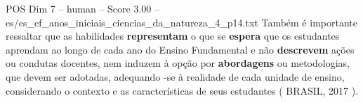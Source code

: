 \begin{textsample}{POS Dim 7 – human – Score 3.00 – es/es\_ef\_anos\_iniciais\_ciencias\_da\_natureza\_4\_p14.txt}  \label{ex:f7_pos_020}
Também é importante ressaltar que as habilidades \textbf{representam} o que se \textbf{espera} que os estudantes aprendam ao longo de cada ano do Ensino Fundamental e não \textbf{descrevem} ações ou condutas docentes, nem induzem à opção por \textbf{abordagens} ou metodologias, que devem ser adotadas, adequando -se à realidade de cada unidade de ensino, considerando o contexto e as características de seus estudantes ( BRASIL, 2017 ).

\end{textsample}
